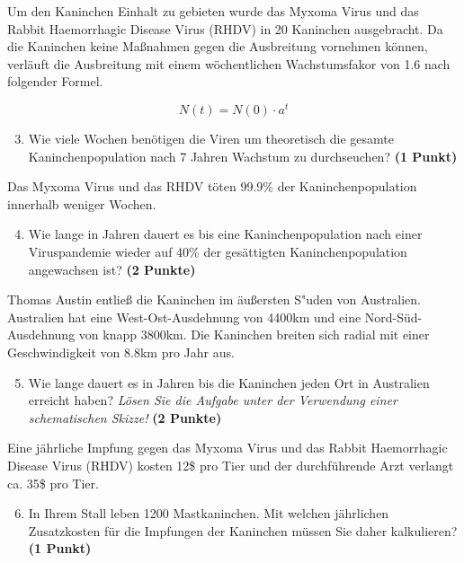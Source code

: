 \documentclass[a4paper, 9pt]{scrartcl}\usepackage[]{graphicx}\usepackage[]{xcolor}
\begin{document}
Um den Kaninchen Einhalt zu gebieten wurde das Myxoma Virus und das Rabbit
Haemorrhagic Disease Virus (RHDV) in 20 Kaninchen
ausgebracht. Da die Kaninchen keine Ma{\ss}nahmen gegen die Ausbreitung
vornehmen k{\"o}nnen, verl{\"a}uft die Ausbreitung mit einem w{\"o}chentlichen
Wachstumsfakor von 1.6 nach folgender Formel.

\begin{equation*}
  N(t) = N(0) \cdot a^t
\end{equation*}

\begin{enumerate}
  \setcounter{enumi}{2}
\item Wie viele Wochen ben{\"o}tigen die Viren um theoretisch die gesamte
  Kaninchenpopulation nach 7 Jahren Wachstum zu
  durchseuchen? \textbf{(1 Punkt)}
\end{enumerate}

Das Myxoma Virus und das RHDV t{\"o}ten 99.9\% der
Kaninchenpopulation innerhalb weniger Wochen.

\begin{enumerate}
  \setcounter{enumi}{3}  
\item Wie lange in Jahren dauert es bis eine Kaninchenpopulation nach einer
  Viruspandemie wieder auf 40\% der ges{\"a}ttigten
  Kaninchenpopulation angewachsen ist?  \textbf{(2 Punkte)}
\end{enumerate}

Thomas Austin entlie{\ss} die Kaninchen im {\"a}u{\ss}ersten S{"u}den von
Australien. Australien hat eine West-Ost-Ausdehnung von 4400km
und eine Nord-S{\"u}d-Ausdehnung von knapp 3800km. Die Kaninchen
breiten sich radial mit einer Geschwindigkeit von 8.8km pro
Jahr aus.

\begin{enumerate}
  \setcounter{enumi}{4}
\item Wie lange dauert es in Jahren bis die Kaninchen jeden Ort
  in Australien erreicht haben? \textit{L{\"o}sen Sie die Aufgabe unter der
    Verwendung einer schematischen Skizze!} \textbf{(2 Punkte)}
\end{enumerate}

Eine j{\"a}hrliche Impfung gegen das Myxoma Virus und das Rabbit Haemorrhagic
Disease Virus (RHDV) kosten 12\$ pro Tier und der
durchf{\"u}hrende Arzt verlangt ca. 35\$ pro Tier.

\begin{enumerate}
  \setcounter{enumi}{5}
\item In Ihrem Stall leben 1200 Mastkaninchen. Mit welchen
  j{\"a}hrlichen Zusatzkosten f{\"u}r die Impfungen der Kaninchen m{\"u}ssen Sie daher
  kalkulieren? \textbf{(1 Punkt)}
\end{enumerate}
 
\end{document}
